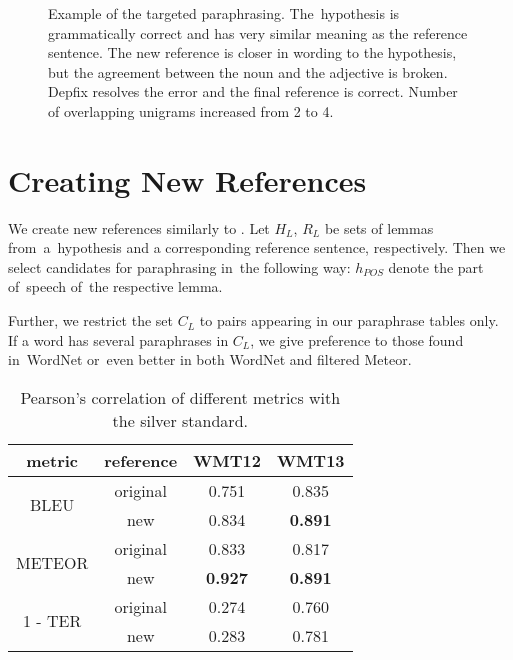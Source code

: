 \begin{figure*}[htb]
\begin{center}
\begin{tabular}{r|l}
\end{tabular}
\caption{Example of the targeted paraphrasing. The~hypothesis is grammatically 
correct and has very similar meaning as the reference sentence. The new reference is closer 
in wording to the hypothesis, but the agreement between the noun and the adjective is broken. 
Depfix resolves the error and the final reference is correct. Number of overlapping unigrams
increased from 2 to 4.}
\label{example}
\end{center}
\end{figure*}

\section{Creating New References}
\label{creating_new_references}
We create new references similarly to \cite{kauchak}. Let $ H_{L} $, $ R_{L} $ be 
sets of lemmas from~a~hypothesis and a corresponding reference sentence, 
respectively. Then we select candidates for paraphrasing in~the following way:
$ h_{POS} $ denote the part of~speech of~the respective lemma.

Further, we restrict the set $ C_{L} $ to pairs appearing in our paraphrase tables only.
If a word has several paraphrases in $ C_{L} $, we give preference to those found 
in~WordNet or~even better in both WordNet and filtered Meteor.

\begin{table}[tb]
\begin{center}
\begin{tabular}{c|c|c|c}
metric  & reference &  WMT12  &  WMT13 \\
\hline
\multirow{2}{*}{BLEU}   & original & 0.751 & 0.835 \\
                        \cline{2-4}
                        & new  & 0.834 & \textbf{0.891} \\
\hline
\multirow{2}{*}{METEOR} & original & 0.833 & 0.817 \\
                        \cline{2-4}
                        & new  & \textbf{0.927} & \textbf{0.891} \\
\hline
\multirow{2}{*}{1 - TER} & original & 0.274 & 0.760 \\
                        \cline{2-4}
                         & new  & 0.283 & 0.781 \\
\end{tabular}
\end{center}
\caption{Pearson's correlation of different metrics with the silver standard.}
\label{choosing}
\end{table}
 
